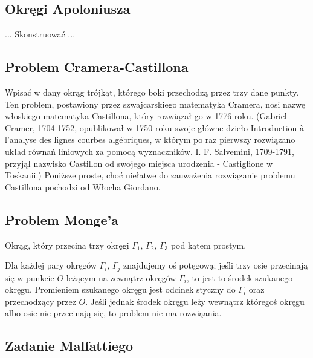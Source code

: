\subsection{Okręgi Apoloniusza}
\begin{problem}
    \label{problem_apolloniusza}%
    ...
    Skonstruować ...
\end{problem}

\subsection{Problem Cramera-Castillona}
Wpisać w dany okrąg trójkąt, którego boki przechodzą przez trzy dane punkty.
Ten problem, postawiony przez szwajcarskiego matematyka Cramera, nosi nazwę włoskiego matematyka Castillona, który rozwiązał go w 1776 roku.
(Gabriel Cramer, 1704-1752, opublikował w 1750 roku swoje główne dzieło Introduction à l’analyse des lignes courbes algébriques, w którym po raz pierwszy rozwiązano układ równań liniowych za pomocą wyznaczników.
I. F. Salvemini, 1709-1791, przyjął nazwisko Castillon od swojego miejsca urodzenia - Castiglione w Toskanii.)
Poniższe proste, choć niełatwe do zauważenia rozwiązanie problemu Castillona pochodzi od Włocha Giordano.

\subsection{Problem Monge'a}
\begin{problem}[Monge'a?]
    Okrąg, który przecina trzy okręgi $\Gamma_1$, $\Gamma_2$, $\Gamma_3$ pod kątem prostym.
\end{problem}

Dla każdej pary okręgów $\Gamma_i$, $\Gamma_j$ znajdujemy oś potęgową; jeśli trzy osie przecinają się w punkcie $O$ leżącym na zewnątrz okręgów $\Gamma_i$, to jest to środek szukanego okręgu.
Promieniem szukanego okręgu jest odcinek styczny do $\Gamma_i$ oraz przechodzący przez $O$.
Jeśli jednak środek okręgu leży wewnątrz któregoś okręgu albo osie nie przecinają się, to problem nie ma rozwiąania.

\subsection{Zadanie Malfattiego}


